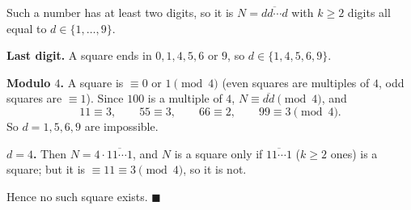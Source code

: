 Such a number has at least two digits, so it is $N=\overline{dd\cdots d}$ with $k\ge2$ digits all equal to $d\in\{1,\dots,9\}$.

\textbf{Last digit.} A square ends in $0,1,4,5,6$ or $9$, so $d\in\{1,4,5,6,9\}$.

\textbf{Modulo $4$.} A square is $\equiv0$ or $1\pmod4$ (even squares are multiples of $4$, odd squares are $\equiv1$). Since $100$ is a multiple of $4$, $N\equiv\overline{dd}\pmod4$, and
\[11\equiv3,\qquad 55\equiv3,\qquad 66\equiv2,\qquad 99\equiv3\pmod4.\]
So $d=1,5,6,9$ are impossible.

\textbf{$d=4$.} Then $N=4\cdot\overline{11\cdots1}$, and $N$ is a square only if $\overline{11\cdots1}$ ($k\ge2$ ones) is a square; but it is $\equiv11\equiv3\pmod4$, so it is not.

Hence no such square exists. $\blacksquare$
